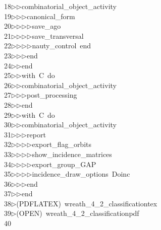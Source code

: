 \begin{tabbing}
18\>$\triangleright$\>$\triangleright$\>combinatorial\_object\_activity\ \\[0pt]
19\>$\triangleright$\>$\triangleright$\>$\triangleright$\>canonical\_form\ \\[0pt]
20\>$\triangleright$\>$\triangleright$\>$\triangleright$\>$\triangleright$\>save\_ago\ \\[0pt]
21\>$\triangleright$\>$\triangleright$\>$\triangleright$\>$\triangleright$\>save\_transversal\ \\[0pt]
22\>$\triangleright$\>$\triangleright$\>$\triangleright$\>$\triangleright$\>nauty\_control\ end\ \\[0pt]
23\>$\triangleright$\>$\triangleright$\>$\triangleright$\>end\ \\[0pt]
24\>$\triangleright$\>$\triangleright$\>end\ \\[0pt]
25\>$\triangleright$\>$\triangleright$\>with\ C\ do\ \\[0pt]
26\>$\triangleright$\>$\triangleright$\>combinatorial\_object\_activity\ \\[0pt]
27\>$\triangleright$\>$\triangleright$\>$\triangleright$\>post\_processing\ \\[0pt]
28\>$\triangleright$\>$\triangleright$\>end\ \\[0pt]
29\>$\triangleright$\>$\triangleright$\>with\ C\ do\ \\[0pt]
30\>$\triangleright$\>$\triangleright$\>combinatorial\_object\_activity\ \\[0pt]
31\>$\triangleright$\>$\triangleright$\>$\triangleright$\>report\ \\[0pt]
32\>$\triangleright$\>$\triangleright$\>$\triangleright$\>$\triangleright$\>export\_flag\_orbits\ \\[0pt]
33\>$\triangleright$\>$\triangleright$\>$\triangleright$\>$\triangleright$\>show\_incidence\_matrices\ \\[0pt]
34\>$\triangleright$\>$\triangleright$\>$\triangleright$\>$\triangleright$\>export\_group\_GAP\ \\[0pt]
35\>$\triangleright$\>$\triangleright$\>$\triangleright$\>$\triangleright$\>incidence\_draw\_options\ Doinc\ \\[0pt]
36\>$\triangleright$\>$\triangleright$\>$\triangleright$\>end\ \\[0pt]
37\>$\triangleright$\>$\triangleright$\>end\\[0pt]
38\>$\triangleright$\>(PDFLATEX)\ wreath\_4\_2\_classificationtex\\[0pt]
39\>$\triangleright$\>(OPEN)\ wreath\_4\_2\_classificationpdf\\[0pt]
40\>\end{tabbing}
